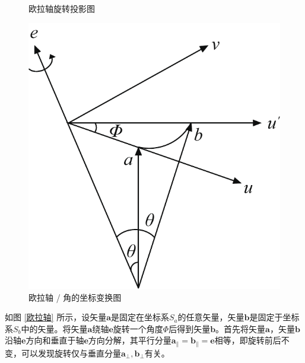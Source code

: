 \begin{figure}[!htb]
\begin{minipage}{0.348\linewidth}
		\caption{欧拉轴旋转投影图}
		\label{欧拉轴2}
	\end{minipage}
	\begin{minipage}{0.33\linewidth}
		\centering
		\includegraphics[width=0.913\linewidth]{pic/欧拉轴角}
		\caption{欧拉轴 / 角的坐标变换图}
		\label{欧拉轴角}
	\end{minipage}
\end{figure}

如图 \ref{欧拉轴} 所示，设矢量$\bm{a}$是固定在坐标系$S_a$的任意矢量，矢量$\bm{b}$是固定于坐标系$S_b$中的矢量。将矢量$\bm{a}$绕轴$\bm{e}$旋转一个角度$\varPhi$后得到矢量$\bm{b}$。首先将矢量$\bm{a}$，矢量$\bm{b}$沿轴$\bm{e}$方向和垂直于轴$\bm{e}$方向分解，其平行分量$\bm{a}_{\parallel} = \bm{b}_{\parallel} = \bm{e}$相等，即旋转前后不变，可以发现旋转仅与垂直分量$\bm{a}_{\perp}, \bm{b}_{\perp}$有关。

